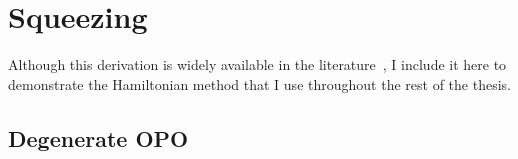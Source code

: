\section{Squeezing}





Although this derivation is widely available in the literature~\cite{}, I include it here to demonstrate the Hamiltonian method that I use throughout the rest of the thesis. 


\subsection{Degenerate OPO}

